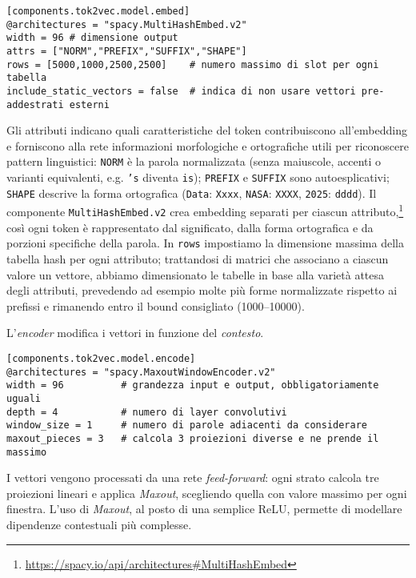 \begin{lstlisting}[style=cmd]
[components.tok2vec.model.embed]
@architectures = "spacy.MultiHashEmbed.v2"
width = 96 # dimensione output
attrs = ["NORM","PREFIX","SUFFIX","SHAPE"]
rows = [5000,1000,2500,2500]    # numero massimo di slot per ogni tabella
include_static_vectors = false  # indica di non usare vettori pre-addestrati esterni
\end{lstlisting}

\noindent Gli attributi indicano quali caratteristiche del token contribuiscono all'embedding e forniscono alla rete informazioni morfologiche e ortografiche utili per riconoscere pattern linguistici: \texttt{NORM} è la parola normalizzata (senza maiuscole, accenti o varianti equivalenti, e.g. \texttt{'s} diventa \texttt{is}); \texttt{PREFIX} e \texttt{SUFFIX} sono autoesplicativi; \texttt{SHAPE} descrive la forma ortografica (\texttt{Data}: \texttt{Xxxx}, \texttt{NASA}: \texttt{XXXX}, \texttt{2025}: \texttt{dddd}). Il componente \texttt{MultiHashEmbed.v2} crea embedding separati per ciascun attributo,\footnote{\url{https://spacy.io/api/architectures\#MultiHashEmbed}} così ogni token è rappresentato dal significato, dalla forma ortografica e da porzioni specifiche della parola. In \texttt{rows} impostiamo la dimensione massima della tabella hash per ogni attributo; trattandosi di matrici che associano a ciascun valore un vettore, abbiamo dimensionato le tabelle in base alla varietà attesa degli attributi, prevedendo ad esempio molte più forme normalizzate rispetto ai prefissi e rimanendo entro il bound consigliato (1000--10000).

\noindent L'\textit{encoder} modifica i vettori in funzione del \textit{contesto}.

\begin{lstlisting}[style=cmd]
[components.tok2vec.model.encode]
@architectures = "spacy.MaxoutWindowEncoder.v2"
width = 96          # grandezza input e output, obbligatoriamente uguali
depth = 4           # numero di layer convolutivi
window_size = 1     # numero di parole adiacenti da considerare
maxout_pieces = 3   # calcola 3 proiezioni diverse e ne prende il massimo
\end{lstlisting}

\noindent I vettori vengono processati da una rete \textit{feed-forward}: ogni strato calcola tre proiezioni lineari e applica \textit{Maxout}, scegliendo quella con valore massimo per ogni finestra. L'uso di \textit{Maxout}, al posto di una semplice ReLU, permette di modellare dipendenze contestuali più complesse.
